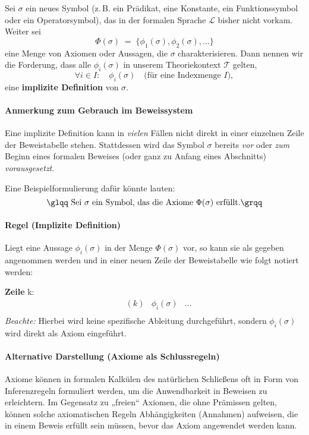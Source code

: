 \documentclass[main.tex]{subfiles}
\begin{document}
\begin{definition}
\label{dfSigmaGenImplicitAxiom}
Sei \(\sigma\) ein neues Symbol (z.\,B. ein Prädikat, eine Konstante, ein Funktionssymbol oder ein Operatorsymbol), das in der formalen Sprache \(\mathcal{L}\) bisher nicht vorkam. Weiter sei
\[
\Phi(\sigma) \;=\; \{\phi_1(\sigma), \phi_2(\sigma), \dots\}
\]
eine Menge von Axiomen oder Aussagen, die \(\sigma\) charakterisieren. Dann nennen wir die Forderung, dass alle \(\phi_i(\sigma)\) in unserem Theoriekontext \(\mathcal{T}\) gelten,
\[
\forall i \in I:\quad \phi_i(\sigma) \quad \text{(für eine Indexmenge }I\text{)},
\]
eine \textbf{implizite Definition} von \(\sigma\).
\end{definition}

\paragraph{Anmerkung zum Gebrauch im Beweissystem}
Eine implizite Definition kann in \emph{vielen} Fällen nicht direkt in einer einzelnen Zeile der Beweistabelle stehen. Stattdessen wird das Symbol \(\sigma\) bereits \emph{vor} oder \emph{zum} Beginn eines formalen Beweises (oder ganz zu Anfang eines Abschnitts) \emph{vorausgesetzt}. 

Eine Beispielformulierung dafür könnte lauten:
\[
\text{\glqq Sei }\sigma\text{ ein Symbol, das die Axiome }\Phi(\sigma)\text{ erfüllt.\grqq}
\]

\paragraph{Regel (Implizite Definition)}
Liegt eine Aussage \(\phi_i(\sigma)\) in der Menge \(\Phi(\sigma)\) vor, so kann sie als gegeben angenommen werden und in einer neuen Zeile der Beweistabelle wie folgt notiert werden:

\textbf{Zeile }k:
\[
\begin{array}{llll}
   \ & (k) & \phi_i(\sigma) & ... \\
\end{array}
\]
\emph{Beachte:} Hierbei wird keine spezifische Ableitung durchgeführt, sondern \(\phi_i(\sigma)\) wird direkt als Axiom eingeführt.

\paragraph{Alternative Darstellung (Axiome als Schlussregeln)}
Axiome können in formalen Kalkülen des natürlichen Schließens oft in Form von Inferenzregeln formuliert werden, um die Anwendbarkeit in Beweisen zu erleichtern. Im Gegensatz zu „freien“ Axiomen, die ohne Prämissen gelten, können solche axiomatischen Regeln Abhängigkeiten (Annahmen) aufweisen, die in einem Beweis erfüllt sein müssen, bevor das Axiom angewendet werden kann.
\end{document}
